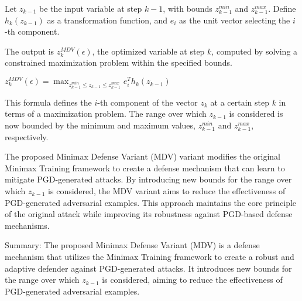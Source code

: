 Let  $z_{k-1}$ be the input variable at step  $k-1$, with bounds $z_{k-1}^{min}$ and  $z_{k-1}^{max}$. 
Define $h_k(z_{k-1})$ as a transformation function, and  $e_i$ as the unit vector selecting the $i$ -th component.

The output is  $z_k^{MDV}(\epsilon)$, the optimized variable at step $k$,  computed by solving a constrained maximization problem within the specified bounds.



$z_k^{MDV}(\epsilon) = \max_{z_{k-1}^{min} \leq z_{k-1} \leq z_{k-1}^{max}} e^T_i h_k(z_{k-1})$

This formula defines the $i$-th component of the vector $z_k$ at a certain step $k$ in terms of a maximization problem. The range over which $z_{k-1}$ is considered is now bounded by the minimum and maximum values, $z_{k-1}^{min}$ and $z_{k-1}^{max}$, respectively.

The proposed Minimax Defense Variant (MDV) variant modifies the original Minimax Training framework to create a defense mechanism that can learn to mitigate PGD-generated attacks. By introducing new bounds for the range over which $z_{k-1}$ is considered, the MDV variant aims to reduce the effectiveness of PGD-generated adversarial examples. This approach maintains the core principle of the original attack while improving its robustness against PGD-based defense mechanisms.

Summary: The proposed Minimax Defense Variant (MDV) is a defense mechanism that utilizes the Minimax Training framework to create a robust and adaptive defender against PGD-generated attacks. It introduces new bounds for the range over which $z_{k-1}$ is considered, aiming to reduce the effectiveness of PGD-generated adversarial examples.